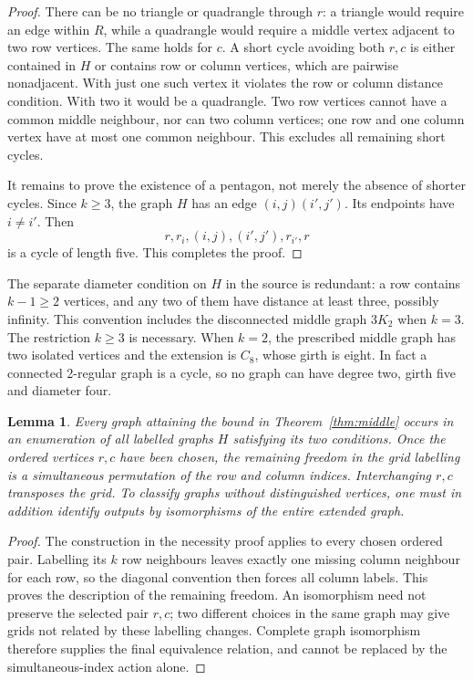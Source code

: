 \documentclass[11pt,a4paper]{article}
\newtheorem{lemma}[theorem]{Lemma}
\begin{document}
\begin{proof}
There can be no triangle or quadrangle through $r$: a triangle
would require an edge within $R$, while a quadrangle would require
a middle vertex adjacent to two row vertices. The same holds for
$c$. A short cycle avoiding both $r,c$ is either contained in $H$
or contains row or column vertices, which are pairwise nonadjacent.
With just one such vertex it violates the row or column distance
condition. With two it would be a quadrangle. Two row vertices
cannot have a common middle neighbour, nor can two column vertices;
one row and one column vertex have at most one common neighbour.
This excludes all remaining short cycles.

It remains to prove the existence of a pentagon, not merely the
absence of shorter cycles. Since $k\geq3$, the graph $H$ has an
edge $(i,j)(i',j')$. Its endpoints have $i\ne i'$. Then
\[
 r,r_i,(i,j),(i',j'),r_{i'},r
\]
is a cycle of length five. This completes the proof.
\end{proof}

The separate diameter condition on $H$ in the source is redundant:
a row contains $k-1\geq2$ vertices, and any two of them have distance
at least three, possibly infinity. This convention includes the
disconnected middle graph $3K_2$ when $k=3$.
The restriction $k\geq3$ is necessary. When $k=2$, the prescribed
middle graph has two isolated vertices and the extension is $C_8$,
whose girth is eight. In fact a connected 2-regular graph is a cycle,
so no graph can have degree two, girth five and diameter four.

\begin{lemma}\label{lem:labels}
Every graph attaining the bound in Theorem~\ref{thm:middle} occurs in
an enumeration of all labelled graphs $H$ satisfying its two conditions.
Once the ordered vertices $r,c$ have been chosen, the remaining
freedom in the grid labelling is a simultaneous permutation of the
row and column indices. Interchanging $r,c$ transposes the grid.
To classify graphs without distinguished vertices, one must in
addition identify outputs by isomorphisms of the entire extended graph.
\end{lemma}
\begin{proof}
The construction in the necessity proof applies to every chosen
ordered pair. Labelling its $k$ row neighbours leaves exactly one
missing column neighbour for each row, so the diagonal convention
then forces all column labels. This proves the description of the
remaining freedom. An isomorphism need not preserve the selected
pair $r,c$; two different choices in the same graph may give grids
not related by these labelling changes. Complete graph isomorphism
therefore supplies the final equivalence relation, and cannot be
replaced by the simultaneous-index action alone.
\end{proof}
\end{document}
